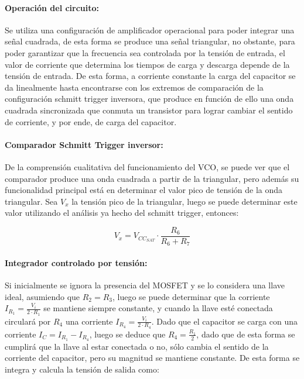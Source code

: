 \paragraph{Operaci\'on del circuito:} Se utiliza una configuraci\'on de amplificador operacional para poder integrar una se\~nal cuadrada,
de esta forma se produce una se\~nal triangular, no obstante, para poder garantizar que la frecuencia sea controlada por la tensi\'on de entrada,
el valor de corriente que determina los tiempos de carga y descarga depende de la tensi\'on de entrada. De esta forma, a corriente constante la carga del capacitor
se da linealmente hasta encontrarse con los extremos de comparaci\'on de la configuraci\'on schmitt trigger inversora, que produce en funci\'on de ello una onda
cuadrada sincronizada que conmuta un transistor para lograr cambiar el sentido de corriente, y por ende, de carga del capacitor.

\paragraph{Comparador Schmitt Trigger inversor:} De la comprensi\'on cualitativa del funcionamiento del VCO, se puede ver que el comparador
produce una onda cuadrada a partir de la triangular, pero adem\'as su funcionalidad principal est\'a en determinar el valor pico de tensi\'on de la onda triangular.
Sea $V_x$ la tensi\'on pico de la triangular, luego se puede determinar este valor utilizando el an\'alisis ya hecho del schmitt trigger, entonces:

\begin{equation}
    V_x = V_{CC_{SAT}} \cdot \frac{R_6}{R_6 + R_7}
    \label{eq:ecuacion_tensiones_vco}
\end{equation}

\paragraph{Integrador controlado por tensi\'on:} Si inicialmente se ignora la presencia del MOSFET y se lo considera una llave ideal, asumiendo que $R_2 = R_3$,
luego se puede determinar que la corriente $I_{R_1} = \frac{V_i}{2 \cdot R_1}$ se mantiene siempre constante, y cuando la llave est\'e conectada circular\'a por $R_4$ una corriente $I_{R_4} = \frac{V_i}{2 \cdot R_4}$. Dado que el capacitor se carga con una corriente $I_C = I_{R_1} - I_{R_4}$, luego
se deduce que $R_4 = \frac{R_1}{2}$, dado que de esta forma se cumplir\'a que la llave al estar conectada o no, s\'olo cambia el sentido de la corriente del capacitor,
pero su magnitud se mantiene constante. De esta forma se integra y calcula la tensi\'on de salida como:

